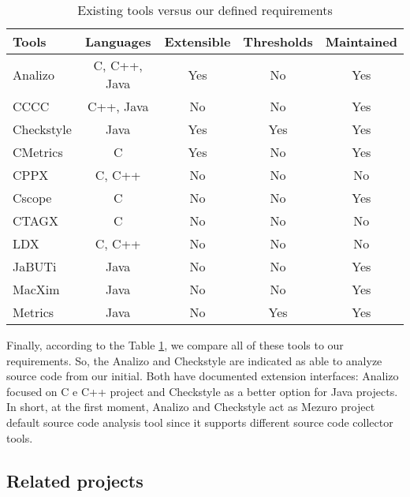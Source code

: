 \begin{table}[htb]
  \centering
  \begin{tabular}{|l|c|c|c|c|}
    \hline
    \textbf{Tools} &
    \textbf{Languages} & %
    \textbf{Extensible} & %
    \textbf{Thresholds} & %
    \textbf{Maintained} \\\hline\hline %
				    
    Analizo 	& C, C++, Java & Yes & No  & Yes    \\\hline
    CCCC 	& C++, Java    & No  & No  & Yes    \\\hline
    Checkstyle	& Java         & Yes  & Yes & Yes    \\\hline
    CMetrics	& C            & Yes & No  & Yes    \\\hline
    CPPX	& C, C++       & No  & No  & No     \\\hline
    Cscope	& C            & No  & No  & Yes    \\\hline
    CTAGX	& C            & No  & No  & No     \\\hline
    LDX		& C, C++       & No  & No  & No     \\\hline
    JaBUTi	& Java         & No  & No  & Yes    \\\hline
    MacXim	& Java         & No  & No  & Yes    \\\hline
    Metrics 	& Java         & No  & Yes & Yes    \\\hline
    
  \end{tabular}


  \caption{Existing tools versus our defined requirements}
  \label{tab:tools}
\end{table}
\vspace{-1em}

Finally, according to the Table \ref{tab:tools}, we compare all of these tools
to our requirements. So, the Analizo and Checkstyle are indicated as able to
analyze source code from our initial. Both have documented extension
interfaces: Analizo focused on C e C++ project and Checkstyle as a better
option for Java projects. In short,  at the first moment, Analizo and
Checkstyle act as Mezuro project default source code analysis tool since it
supports different source code collector tools.


\subsection{Related projects}
\label{subsec:related-projects}

